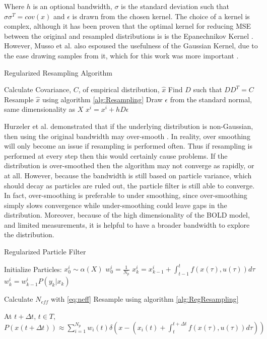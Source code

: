 Where $h$ is an optional bandwidth, $\sigma$ is the standard deviation such that 
$\sigma \sigma^T = cov(x)$
and $\epsilon$ is drawn from the chosen kernel. The choice of a kernel is
complex, although it has been proven that the optimal kernel for reducing MSE between
the original and resampled distributions is 
is the Epanechnikov Kernel \cite{Musso2001a}. However, Musso et al. 
also espoused the usefulness of the Gaussian Kernel, due to the ease
drawing samples from it, which for this work was more important \cite{Musso2001a}.

\begin{algorithm}
\caption{Regularized Resampling Algorithm}
\begin{algorithmic}
\STATE Calculate Covariance, $C$, of empirical distribution, $\hat{x}$
\STATE Find $D$ such that $DD^T = C$
\STATE Resample $\hat{x}$ using algorithm \autoref{alg:Resampling}
    \STATE Draw $\epsilon$ from the standard normal, same dimensionality as $X$
    \STATE $x^i = x^i + hD\epsilon$
\ENDFOR
\end{algorithmic}
\label{alg:RegResampling}
\end{algorithm}

Hurzeler et al. demonstrated that if the underlying 
distribution is non-Gaussian, then using the original bandwidth may over-smooth
\cite{Hurzeler1998}.  In reality, over smoothing
will only become an issue if resampling is performed often. Thus
if resampling is performed at every step then this would certainly cause problems.
If the distribution is over-smoothed then the algorithm may not converge as rapidly,
or at all. However, because the bandwidth is still based on particle variance, 
which should decay as particles are ruled out, the particle filter is still able to converge. 
In fact, over-smoothing is preferable
to under smoothing, since over-smoothing simply slows convergence while 
under-smoothing could leave gaps in the distribution.
Moreover, because of the high dimensionality of the BOLD model,
and limited measurements, it is helpful to have a broader bandwidth to explore the distribution. 

\begin{algorithm}
\caption{Regularized Particle Filter}
\begin{algorithmic}
\STATE Initialize Particles:
    \STATE $x^i_0  \sim \alpha(X)$
    \STATE $w^i_0 = \frac{1}{N_p}$
\ENDFOR
{}
        \STATE $x^i_k = x^i_{k-1} + \int_{t-1}^t f(x(\tau), u(\tau)) d\tau $
        \STATE $w^i_k = w^i_{k-1}P(y_k | x_k)$
    \ENDFOR

    \STATE Calculate $N_{eff}$ with \autoref{eq:neff}
        \STATE Resample using algorithm \autoref{alg:RegResampling}
    \ENDIF
\ENDFOR

\STATE At $t + \Delta t$, $t \in T$, $P(x(t+\Delta t)) \approx 
\sum_{i=1}^{N_p} w_i(t)\delta\left(x - (x_i(t) + \int_t^{t+\Delta t} f(x(\tau), u(\tau)) d\tau) \right)$
 \end{algorithmic}
 \label{alg:RegularizedParticleFilter}
 \end{algorithm}

